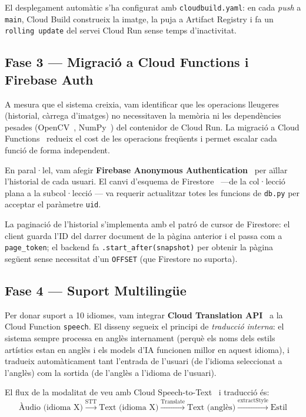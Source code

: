 El desplegament automàtic s'ha configurat amb \texttt{cloudbuild.yaml}: en cada \textit{push} a \texttt{main}, Cloud Build construeix la imatge, la puja a Artifact Registry i fa un \texttt{rolling update} del servei Cloud Run sense temps d'inactivitat.

\subsection{Fase 3 — Migració a Cloud Functions i Firebase Auth}

A mesura que el sistema creixia, vam identificar que les operacions lleugeres (historial, càrrega d'imatges) no necessitaven la memòria ni les dependències pesades (OpenCV~\cite{opencv}, NumPy~\cite{numpy}) del contenidor de Cloud Run. La migració a Cloud Functions~\cite{cloudfunctions} redueix el cost de les operacions freqüents i permet escalar cada funció de forma independent.

En paral·lel, vam afegir \textbf{Firebase Anonymous Authentication}~\cite{firebase} per aïllar l'historial de cada usuari. El canvi d'esquema de Firestore~\cite{firestore} —de la col·lecció plana  a la subcol·lecció — va requerir actualitzar totes les funcions de \texttt{db.py} per acceptar el paràmetre \texttt{uid}.

La paginació de l'historial s'implementa amb el patró de cursor de Firestore: el client guarda l'ID del darrer document de la pàgina anterior i el passa com a \texttt{page\_token}; el backend fa \texttt{.start\_after(snapshot)} per obtenir la pàgina següent sense necessitat d'un \texttt{OFFSET} (que Firestore no suporta).

\subsection{Fase 4 — Suport Multilingüe}

Per donar suport a 10 idiomes, vam integrar \textbf{Cloud Translation API}~\cite{translate} a la Cloud Function \texttt{speech}. El disseny segueix el principi de \textit{traducció interna}: el sistema sempre processa en anglès internament (perquè els noms dels estils artístics estan en anglès i els models d'IA funcionen millor en aquest idioma), i tradueix automàticament tant l'entrada de l'usuari (de l'idioma seleccionat a l'anglès) com la sortida (de l'anglès a l'idioma de l'usuari).

El flux de la modalitat de veu amb Cloud Speech-to-Text~\cite{stt} i traducció és:
\[
\text{Àudio (idioma X)} \xrightarrow{\text{STT}} \text{Text (idioma X)} \xrightarrow{\text{Translate}} \text{Text (anglès)} \xrightarrow{\text{extractStyle}} \text{Estil}
\]

